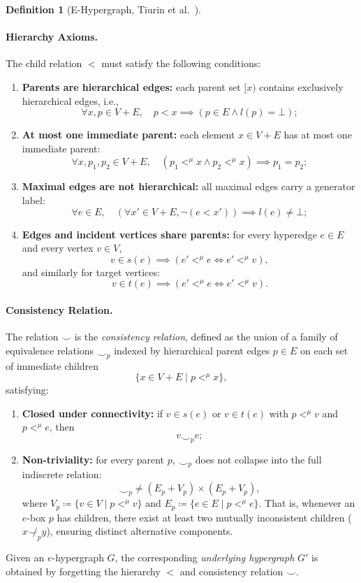 \documentclass[11pt,a4paper]{article}
\theoremstyle{definition}
\newtheorem{definition}{Definition}[section]
\theoremstyle{plain}
\begin{document}
\begin{definition}[E-Hypergraph, Tiurin et al.~\cite{tiurin2024equivalence}]
\paragraph{Hierarchy Axioms.}
The child relation $<$ must satisfy the following conditions:
\begin{enumerate}[label=(\arabic*)]
    \item \textbf{Parents are hierarchical edges:} each parent set $[x)$ contains exclusively hierarchical edges, i.e.,
    \[
    \forall x, p \in V + E, \quad p < x \implies (p \in E \land l(p) = \bot);
    \]
    \item \textbf{At most one immediate parent:} each element $x \in V + E$ has at most one immediate parent:
    \[
    \forall x, p_1, p_2 \in V + E, \quad (p_1 <^\mu x \land p_2 <^\mu x) \implies p_1 = p_2;
    \]
    \item \textbf{Maximal edges are not hierarchical:} all maximal edges carry a generator label:
    \[
    \forall e \in E, \quad (\forall x' \in V + E, \neg(e < x')) \implies l(e) \neq \bot;
    \]
    \item \textbf{Edges and incident vertices share parents:} for every hyperedge $e \in E$ and every vertex $v \in V$,
    \[
    v \in s(e) \implies (e' <^\mu e \iff e' <^\mu v),
    \]
    and similarly for target vertices:
    \[
    v \in t(e) \implies (e' <^\mu e \iff e' <^\mu v).
    \]
\end{enumerate}

\paragraph{Consistency Relation.}
The relation $\smile$ is the \emph{consistency relation}, defined as the union of a family of equivalence relations $\smile_p$ indexed by hierarchical parent edges $p \in E$ on each set of immediate children
\[
\{ x \in V + E \mid p <^\mu x \},
\]
satisfying:
\begin{enumerate}[label=(\alph*)]
    \item \textbf{Closed under connectivity:} if $v \in s(e)$ or $v \in t(e)$ with $p <^\mu v$ and $p <^\mu e$, then
    \[
    v \smile_p e;
    \]
    \item \textbf{Non-triviality:} for every parent $p$, $\smile_p$ does not collapse into the full indiscrete relation:
    \[
    \smile_p \neq (E_p + V_p) \times (E_p + V_p),
    \]
    where $V_p \coloneqq \{ v \in V \mid p <^\mu v \}$ and $E_p \coloneqq \{ e \in E \mid p <^\mu e \}$. That is, whenever an $e$-box $p$ has children, there exist at least two mutually inconsistent children ($x \not\smile_p y$), ensuring distinct alternative components.
\end{enumerate}

Given an $e$-hypergraph $G$, the corresponding \emph{underlying hypergraph} $G'$ is obtained by forgetting the hierarchy $<$ and consistency relation $\smile$.
\end{definition}
\end{document}
